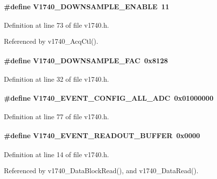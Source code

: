 \paragraph[{V1740\_\-DOWNSAMPLE\_\-ENABLE}]{\setlength{\rightskip}{0pt plus 5cm}\#define V1740\_\-DOWNSAMPLE\_\-ENABLE~11}\hfill\label{v1740_8h_a0ad2a47dccaa5d7b856040d19f6280eb}


Definition at line 73 of file v1740.h.

Referenced by v1740\_\-AcqCtl().
\paragraph[{V1740\_\-DOWNSAMPLE\_\-FAC}]{\setlength{\rightskip}{0pt plus 5cm}\#define V1740\_\-DOWNSAMPLE\_\-FAC~0x8128}\hfill\label{v1740_8h_a3ebdf2cecfb4eedcb09064d82762a3a0}


Definition at line 32 of file v1740.h.
\paragraph[{V1740\_\-EVENT\_\-CONFIG\_\-ALL\_\-ADC}]{\setlength{\rightskip}{0pt plus 5cm}\#define V1740\_\-EVENT\_\-CONFIG\_\-ALL\_\-ADC~0x01000000}\hfill\label{v1740_8h_a742b6c15344c0556bc1fe60ab27f6a96}


Definition at line 77 of file v1740.h.
\paragraph[{V1740\_\-EVENT\_\-READOUT\_\-BUFFER}]{\setlength{\rightskip}{0pt plus 5cm}\#define V1740\_\-EVENT\_\-READOUT\_\-BUFFER~0x0000}\hfill\label{v1740_8h_aaa94151afe86f4e73713e0a6811d47fb}


Definition at line 14 of file v1740.h.

Referenced by v1740\_\-DataBlockRead(), and v1740\_\-DataRead().
